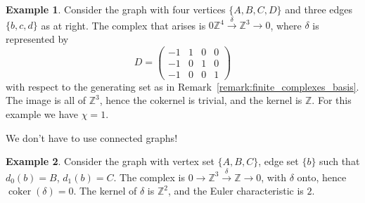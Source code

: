 \documentclass{tufte-handout}
\def\ZZ{\mathbb{Z}}
\DeclareMathOperator{\coker}{coker}
\theoremstyle{definition}
\newtheorem{example}{Example}
\begin{document}
\begin{example}\label{eg:triangle_graph_cplx}
Consider 
the graph with four vertices $\{A,B,C,D\}$ and three edges $\{b,c,d\}$ as at right. The complex that arises is $0\ZZ^4\xrightarrow{\delta} \ZZ^3 \to 0$, where $\delta$ is represented by
\[
	D = \begin{pmatrix}
		-1 & 1 & 0 & 0\\
		-1 & 0 & 1 & 0\\
		-1 & 0 & 0 & 1
	\end{pmatrix}
\]
with respect to the generating set as in Remark~\ref{remark:finite_complexes_basis}. The 
image is all of $\ZZ^3$, hence the cokernel is trivial, and the kernel is $\ZZ$. For 
this example we have $\chi = 1$.
\end{example}

We don't have to use connected graphs!

\begin{example}
Consider
the graph with vertex set $\{A,B,C\}$, edge set $\{b\}$ such that $d_0(b)=B$, 
 $d_1(b)=C$. The complex is $0\to \ZZ^3 \xrightarrow{\delta} \ZZ \to 0$, with 
 $\delta$ onto, hence $\coker(\delta)=0$. The kernel of $\delta$ is $\ZZ^2$, and the 
 Euler characteristic is $2$.

\end{example}
\end{document}
